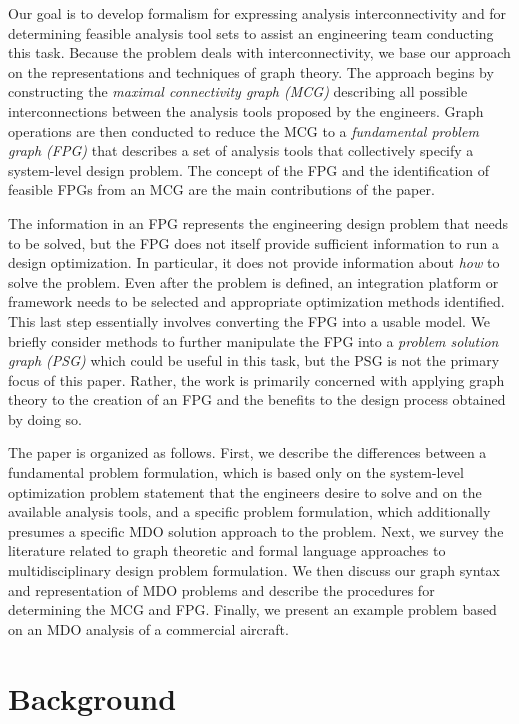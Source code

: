     Our goal is to develop formalism for expressing analysis interconnectivity and for determining feasible
    analysis tool sets to assist an engineering team conducting this task. Because the problem deals with
    interconnectivity, we base our approach on the representations and techniques of graph theory.
    The approach begins by constructing the \emph{maximal connectivity graph (MCG)} describing all possible
    interconnections between the analysis tools proposed by the engineers. Graph operations are then
    conducted to reduce the MCG to a \emph{fundamental problem graph (FPG)} that describes a set of analysis
    tools that collectively specify a system-level design problem. The concept of the FPG and the identification of feasible FPGs from an MCG are the main contributions of the paper.

    The information in an FPG represents the engineering design problem that needs to be solved, but the FPG does not
    itself provide sufficient information to run a design optimization. In particular, it does not provide information
    about \textit{how} to solve the problem. Even after the problem is defined, an integration platform or framework needs
    to be selected and appropriate optimization methods identified. This last step essentially
    involves converting the FPG into a usable model. We briefly consider methods to further
    manipulate the FPG into a \emph{problem solution graph (PSG)} which could be useful in this
    task, but the PSG is not the primary focus of this paper. Rather, the work is primarily concerned with applying graph
    theory to the creation of an FPG and the benefits to the design process obtained by doing so.

    The paper is organized as follows. First, we describe the differences between a fundamental problem
    formulation, which is based only on the system-level optimization problem statement that the
    engineers desire to solve and on the available analysis tools, and a specific problem formulation, which
    additionally presumes a specific MDO solution approach to the problem. Next, we survey the literature related to
    graph theoretic and formal language approaches to multidisciplinary design problem formulation.
    We then discuss our graph syntax and representation of MDO problems and describe the procedures for
    determining the MCG and FPG. Finally, we present an example problem based on an MDO analysis of a
    commercial aircraft.

\section{Background}
